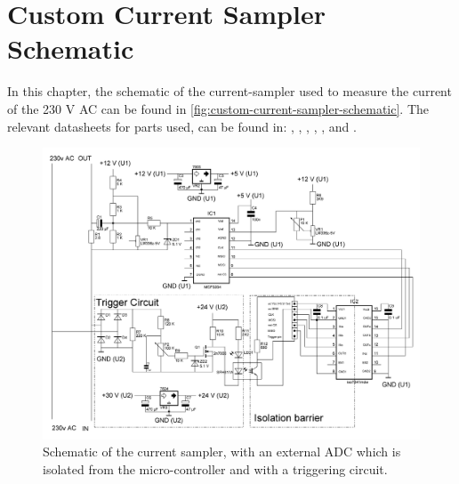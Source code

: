 
\chapter{Custom Current Sampler Schematic}
\label{app:custom-current-sampler-schematic}

In this chapter, the schematic of the current-sampler used to measure the current of the 230 V AC can be found in \autoref{fig:custom-current-sampler-schematic}.
The relevant datasheets for parts used, can be found in: \cite{lm7824-vr-datasheet}, \cite{lm7805-vr-datasheet}, \cite{lm336z-ref-voltage-datasheet}, \cite{mcp3204-adc-datasheet}, \cite{iso7241m-spi-isolator-datasheet}, \cite{2n7000-n-fet-datasheet} and \cite{sfh617a-optocoupler-datasheet}.


\begin{figure}[htb]
	\includegraphics[angle=90,width=\textwidth,height=.9\textheight,keepaspectratio]{chapters/appendix/custom-current-sampler/custom-current-sampler-schematic.jpg}
	\caption{Schematic of the current sampler, with an external ADC which is isolated from the micro-controller and with a triggering circuit.}
	\label{fig:custom-current-sampler-schematic}
\end{figure}

